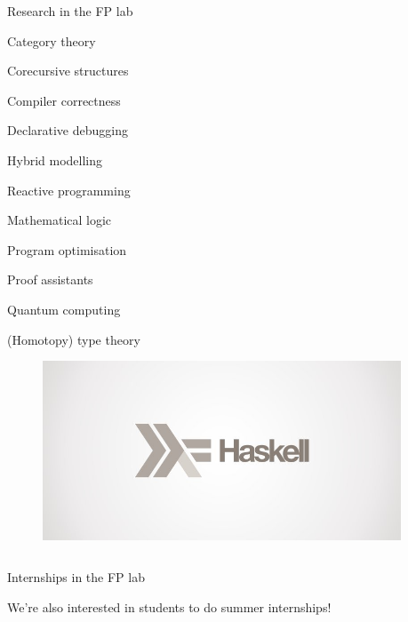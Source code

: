 \documentclass[final]{beamer}
\newlength{\sepwid}
\newlength{\onecolwid}
\newlength{\threecolwid}
\newcommand{\vsp}{\vspace*{2cm}}
\begin{document}
\begin{frame}[t]
\begin{columns}[t]
\begin{column}{\onecolwid}
\begin{block}{Research in the FP lab}
\begin{itemize}
\begin{multicols}{2}
{
	\item Category theory
	\item Corecursive structures
	\item Compiler correctness
	\item Declarative debugging
	\item Hybrid modelling
	\item Reactive programming
	\item Mathematical logic
	\item Program optimisation
	\item Proof assistants
	\item Quantum computing
	\item (Homotopy) type theory
}
\end{multicols}	
\end{itemize}
\end{block}

\vsp


\begin{figure}%
\includegraphics[width=\onecolwid]{haskell-logo-with-name.jpg}
\end{figure}

\end{column}

\begin{column}{\sepwid}\end{column}			%


\end{columns}
\begin{columns}[t]

\begin{column}{\threecolwid}

\begin{block}{Internships in the FP lab}
\begin{center}	
We're also interested in students to do \textcolor{uuxblue}{summer internships}!
\end{center}
\end{block}


\end{column}
\end{columns}
\end{frame}
\end{document}
